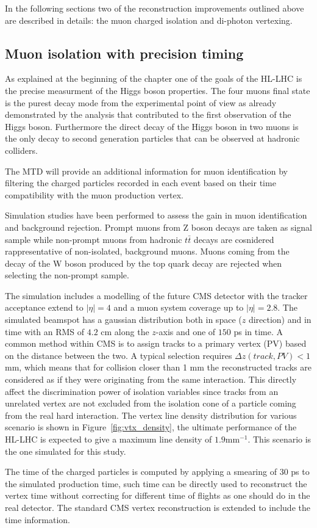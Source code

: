 In the following sections two of the reconstruction improvements outlined above are described in details:
the muon charged isolation and di-photon vertexing.

\subsection{Muon isolation with precision timing}
As explained at the beginning of the chapter one of the goals of the HL-LHC is the precise measurment
of the Higgs boson properties. The four muons final state is the purest decay mode from the experimental point of
view as already demonstrated by the analysis that contributed to the first observation of the Higgs boson.
Furthermore the direct decay of the Higgs boson in two muons is the only decay to second generation
particles that can be observed at hadronic colliders.

The MTD will provide an additional information for muon identification by filtering the charged particles
recorded in each event based on their time compatibility with the muon production vertex.

Simulation studies have been performed to assess the gain in muon identification and background rejection.
Prompt muons from Z boson decays are taken as signal sample while non-prompt muons from hadronic $t\bar{t}$ decays are
cosnidered rappresentative of non-isolated, background muons. Muons coming from the decay of the W boson  produced
by the top quark decay are rejected when selecting the non-prompt sample.

The simulation includes a modelling of the future CMS detector with the tracker acceptance extend to $|\eta|=4$ and
a muon system coverage up to $|\eta|=2.8$. The simulated beamspot has a gaussian distribution both in space ($z$ direction)
and in time with an RMS of $4.2$ cm along the $z$-axis and one of $150$ ps in time.
A common method within CMS is to assign tracks to a primary vertex (PV) based on the distance between the two. A typical selection
requires $\Delta z(track, PV) < 1$ mm, which means that for collision closer than 1 mm the reconstructed tracks are
considered as if they were originating from the same interaction. This directly affect the discrimination power of
isolation variables since tracks from an unrelated vertex are not excluded from the isolation cone of a particle coming
from the real hard interaction.
The vertex line density distribution for various scenario is shown in Figure~\ref{fig:vtx_density}, the ultimate
performance of the HL-LHC is expected to give a maximum line density of $1.9$mm$^{-1}$. This scenario is the one simulated
for this study.

The time of the charged particles is computed by applying a smearing of 30 ps to the simulated production time, such time
can be directly used to reconstruct the vertex time without correcting for different time of flights as one should do
in the real detector. The standard CMS vertex reconstruction is extended to include the time information.







  